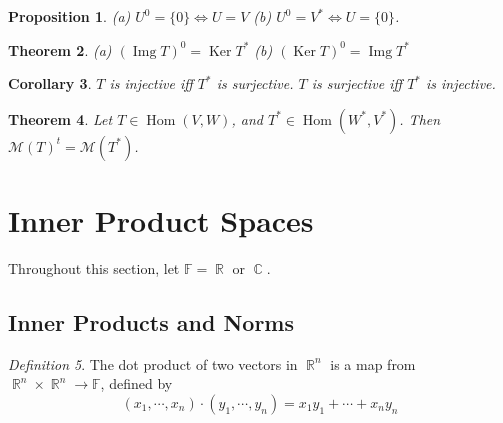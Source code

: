 \documentclass[12pt]{amsart}
\newcommand{\fff}[0]{\mathbb{F}}
\renewcommand{\ker}{\Ker}
\DeclareMathOperator{\Ker}{Ker}
\DeclareMathOperator{\rr}{\mathbb{R}}
\DeclareMathOperator{\cc}{\mathbb{C}}
\DeclareMathOperator{\Hom}{Hom}
\DeclareMathOperator{\img}{Img}
\newcommand{\calM}[0]{\mathcal{M}}
\newtheorem{theorem}{Theorem}[section]
\newtheorem{proposition}[theorem]{Proposition}
\newtheorem{corollary}[theorem]{Corollary}
\theoremstyle{remark}
\newtheorem{definition}[theorem]{Definition}
\numberwithin{equation}{section}
\begin{document}
	\begin{proposition}
		\textup{(a)} $U^0=\{0\}\iff U=V$ \textup{(b)} $U^0=V^*\iff U=\{0\}$.
	\end{proposition}
	\begin{theorem}
		\textup{(a)} $(\img T)^0=\ker T^*$ \textup{(b)} $(\ker T)^0=\img T^*$
	\end{theorem}
	\begin{corollary}
		$T$ is injective iff $T^*$ is surjective. $T$ is surjective iff $T^*$ is injective.
	\end{corollary}
	\begin{theorem}
		Let $T\in \Hom(V,W)$, and $T^*\in\Hom(W^*,V^*)$. Then $\calM(T)^t=\calM(T^*)$.
	\end{theorem}
	\section{Inner Product Spaces}Throughout this section, let $\fff=\rr$ or $\cc$.
	\subsection{Inner Products and Norms}
	\begin{definition}
		The dot product of two vectors in $\rr^n$ is a map from $\rr^n\times \rr^n\to \fff$, defined by
		\[(x_1,\cdots,x_n)\cdot (y_1,\cdots,y_n)=x_1y_1+\cdots+x_ny_n\]
	\end{definition}
	
	
\end{document}
